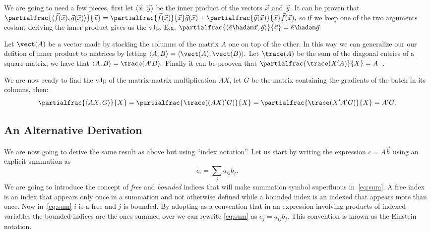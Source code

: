 \documentclass{article}
\begin{document}
We are going to need a few pieces, first let \(\langle\vec x,\vec y\rangle\) be
the inner product of the vectors \(\vec x\) and \(\vec y.\) It can be proven
that \(\partialfrac{\langle\vec f(\vec x),\vec g(\vec x)\rangle}{\vec x}
= \partialfrac{\vec f(\vec x)}{\vec x} \vec g(\vec x)
	+ \partialfrac{\vec g(\vec x)}{\vec x} \vec f(\vec x),\) so if we keep one
of the two arguments costant deriving the inner product gives us the vJp. E.g.
\(\partialfrac{\langle\vec a \hadam \vec x,\vec g\rangle}{\vec x}
= \vec a \hadam \vec g.\)

Let \(\vect(A)\) be a vector made by stacking the columns of the matrix \(A\)
one on top of the other. In this way we can generalize our our defition of
inner product to matrices by letting \(\langle A,B\rangle =
\langle\vect(A),\vect(B)\rangle.\) Let \(\trace(A)\) be the sum of the diagonal
entries of a square matrix, we have that \(\langle A,B\rangle = \trace(A'B).\)
Finally it can be prooven that \(\partialfrac{\trace(X'A)}{X} =
A\)~\cite{cookbook,magnus}.

We are now ready to find the vJp of the matrix-matrix multiplication \(A X\),
let \(G\) be the matrix containing the gradients of the batch in its columns,
then: \[
\partialfrac{\langle AX,G\rangle}{X}
= \partialfrac{\trace((AX)'G)}{X}
= \partialfrac{\trace(X'A'G)}{X}
= A'G.\]


\subsection{An Alternative Derivation}


We are now going to derive the same result as above but using ``index
notation''. Let us start by writing the expression \(c = A \vec b\) using an
explicit summation as
\begin{equation}
	c_i = \sum_j a_{ij} b_j. \label{eq:sum}
\end{equation}
We are going to introduce the concept of \emph{free} and \emph{bounded} indices
that will make summation symbol superfluous in~\ref{eq:sum}. A free index is an
index that appears only once in a summation and not otherwise defined while a
bounded index is an indexed that appears more than once. Now in~\ref{eq:sum}
\(i\) is a free and \(j\) is bounded. By adopting as a convention that in an
expression involving products of indexed variables the bounded indices are the
ones summed over we can rewrite \ref{eq:sum} as \(c_j = a_{ij} b_{j}\). This
convention is known as the Einstein notation.
\end{document}
